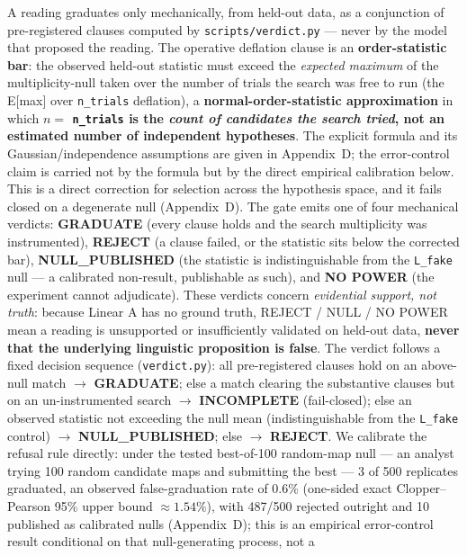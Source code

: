 A reading graduates only mechanically, from held-out data, as a
conjunction of pre-registered clauses computed by \texttt{scripts/verdict.py}
--- never by the model that proposed the reading. The operative deflation
clause is an \textbf{order-statistic bar}: the observed held-out statistic
must exceed the \emph{expected maximum} of the multiplicity-null taken over
the number of trials the search was free to run (the E[max] over
\texttt{n\_trials} deflation), a \textbf{normal-order-statistic
approximation} in which \textbf{$n =$ \texttt{n\_trials} is the \emph{count of
candidates the search tried}, not an estimated number of independent
hypotheses}. The explicit formula and its Gaussian/independence assumptions
are given in Appendix~D; the error-control claim is carried not by the formula
but by the direct empirical calibration below. This is a direct
correction for selection across the hypothesis
space, and it fails closed on a degenerate null (Appendix~D). The gate emits one
of four mechanical verdicts: \textbf{GRADUATE} (every clause holds and the
search multiplicity was instrumented), \textbf{REJECT} (a clause failed, or
the statistic sits below the corrected bar), \textbf{NULL\_PUBLISHED} (the
statistic is indistinguishable from the \texttt{L\_fake} null --- a
calibrated non-result, publishable as such), and \textbf{NO POWER} (the
experiment cannot adjudicate). These verdicts concern \emph{evidential
support, not truth}: because Linear A has no ground truth, REJECT / NULL /
NO POWER mean a reading is unsupported or insufficiently validated on
held-out data, \textbf{never that the underlying linguistic proposition is
false}. The verdict follows a fixed decision sequence
(\texttt{verdict.py}): all pre-registered clauses hold on an above-null
match $\rightarrow$ \textbf{GRADUATE}; else a match clearing the
substantive clauses but on an un-instrumented search $\rightarrow$
\textbf{INCOMPLETE} (fail-closed); else an observed statistic not exceeding
the null mean (indistinguishable from the \texttt{L\_fake} control)
$\rightarrow$ \textbf{NULL\_PUBLISHED}; else $\rightarrow$ \textbf{REJECT}.
We calibrate the refusal rule directly: under the
tested best-of-100 random-map null --- an analyst trying 100 random
candidate maps and submitting the best --- 3 of 500 replicates graduated,
an observed false-graduation rate of 0.6\% (one-sided exact
Clopper--Pearson 95\% upper bound $\approx 1.54\%$), with 487/500 rejected
outright and 10 published as calibrated nulls (Appendix~D); this is an
empirical
error-control result conditional on that null-generating process, not a
